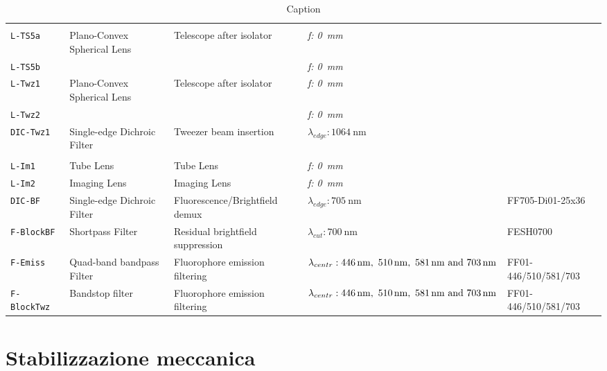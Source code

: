 \begin{table}
\begin{tabular}{>{\tt}l l l >{\it}l l}
            & \\
        L-TS5a
            & Plano-Convex Spherical Lens
            & Telescope after isolator
            & f: \SI{0}{\mm}
            & \\
        L-TS5b
            & & 
            & f: \SI{0}{\mm}
            & \\
        L-Twz1
            & Plano-Convex Spherical Lens
            & Telescope after isolator
            & f: \SI{0}{\mm}
            & \\
        L-Twz2  
            & & 
            & f: \SI{0}{\mm}
            & \\
        DIC-Twz1
            & Single-edge Dichroic Filter
            & Tweezer beam insertion
            & $\lambda_{edge}: \SI{1064}{\nm}$
            & \\
    \multicolumn{5}{l}{\it Imaging Path}\\
        L-Im1  
            & Tube Lens
            & Tube Lens
            & f: \SI{0}{\mm}
            & \\
        L-Im2  
            & Imaging Lens
            & Imaging Lens
            & f: \SI{0}{\mm}
            & \\
        DIC-BF
            & Single-edge Dichroic Filter
            & Fluorescence/Brightfield demux
            & $\lambda_{edge}: \SI{705}{\nm}$
            & FF705-Di01-25x36\\
        F-BlockBF
            & Shortpass Filter
            & Residual brightfield suppression
            & $\lambda_{cut}: \SI{700}{\nm}$
            & FESH0700\\
        F-Emiss
            & Quad-band bandpass Filter
            & Fluorophore emission filtering
            & $\lambda_{centr}: \SIlist{446;510;581;703}{\nm}$
            & FF01-446/510/581/703\\
        F-BlockTwz
            & Bandstop filter
            & Fluorophore emission filtering
            & $\lambda_{centr}: \SIlist{446;510;581;703}{\nm}$
            & FF01-446/510/581/703\\
     \end{tabular}
     \caption{Caption}
     \label{tab:my_label}
 \end{table}
 
 
 \section{Stabilizzazione meccanica}
 \label{sec:stabilization}